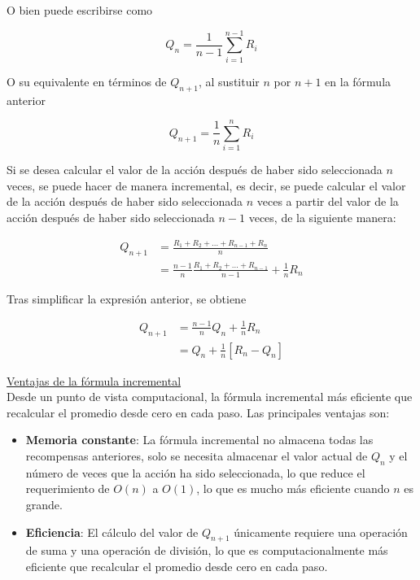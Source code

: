 \documentclass[12pt]{article}
\newlength\tindent
\renewcommand{\indent}{\hspace*{\tindent}}
\begin{document}
    O bien puede escribirse como

    \[ Q_{n} = \frac{1}{n-1} \sum_{i=1}^{n-1} R_{i} \]

    O su equivalente en términos de $Q_{n+1}$, al sustituir $n$ por $n+1$ en la fórmula anterior

    \[ Q_{n+1} = \frac{1}{n} \sum_{i=1}^{n} R_{i} \]

    Si se desea calcular el valor de la acción después de haber sido seleccionada $n$ veces, se puede hacer de manera incremental, es decir, se puede calcular el valor de la acción después de haber sido seleccionada $n$ veces a partir del valor de la acción después de haber sido seleccionada $n-1$ veces, de la siguiente manera:

    \begin{align*}
        Q_{n+1} &= \frac{R_{1} + R_{2} + \ldots + R_{n-1} + R_{n}}{n} \\
        &= \frac{n-1}{n} \frac{R_{1} + R_{2} + \ldots + R_{n-1}}{n-1} + \frac{1}{n} R_{n}
    \end{align*}

    Tras simplificar la expresión anterior, se obtiene

    \begin{align*}
        Q_{n+1} &= \frac{n-1}{n} Q_{n} + \frac{1}{n} R_{n} \\
        &= Q_{n} + \frac{1}{n} \left[ R_{n} - Q_{n} \right]
    \end{align*}

    \indent\underline{Ventajas de la fórmula incremental}\\
    Desde un punto de vista computacional, la fórmula incremental más eficiente que recalcular el promedio desde cero en cada paso.
    Las principales ventajas son:

    \begin{itemize}
       \item \textbf{Memoria constante}: La fórmula incremental no almacena todas las recompensas anteriores, solo se necesita almacenar el valor actual de $Q_{n}$ y el número de veces que la acción ha sido seleccionada, lo que reduce el requerimiento de $O(n)$ a $O(1)$, lo que es mucho más eficiente cuando $n$ es grande.
        \item \textbf{Eficiencia}: El cálculo del valor de $Q_{n+1}$ únicamente requiere una operación de suma y una operación de división, lo que es computacionalmente más eficiente que recalcular el promedio desde cero en cada paso.
    \end{itemize}
\end{document}
